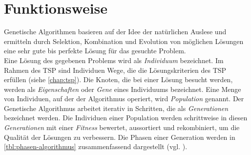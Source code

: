 \documentclass[12pt,a4paper]{scrreprt}
\begin{document}
\section{Funktionsweise}
\label{sec:funktionsweise}

Genetische Algorithmen basieren auf der Idee der natürlichen Auslese und ermitteln durch Selektion, Kombination und Evolution von möglichen Lösungen eine sehr gute bis perfekte Lösung für das gesuchte Problem.\\
Eine Lösung des gegebenen Problems wird als \textit{Individuum} bezeichnet. Im Rahmen des TSP sind Individuen Wege, die die Lösungskriterien des TSP erfüllen (siehe \autoref{chap:tsp}). Die Knoten, die bei einer Lösung besucht werden, werden als \textit{Eigenschaften} oder \textit{Gene} eines Individuums bezeichnet. Eine Menge von Individuen, auf der der Algorithmus operiert, wird \textit{Population} genannt. Der Genetische Algorithmus arbeitet iterativ in Schritten, die als \textit{Generationen} bezeichnet werden. Die Individuen einer Population werden schrittweise in diesen \textit{Generationen} mit einer \textit{Fitness} bewertet, aussortiert und rekombiniert, um die Qualität der Lösungen zu verbessern. Die Phasen einer Generation werden in \autoref{tbl:phasen-algorithmus} zusammenfassend dargestellt (vgl. \cite{jacobsen12A}).
\pagebreak
\end{document}

